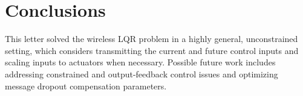 \documentclass[journal,twoside,web]{ieeecolor}
\begin{document}
\section{Conclusions}\label{sec:conclusions}
This letter solved the wireless LQR %
problem in a highly general, unconstrained setting, which considers transmitting the current and future control inputs and scaling inputs to actuators when necessary. Possible future work includes addressing constrained and output-feedback control issues and optimizing message dropout compensation parameters.



\end{document}
